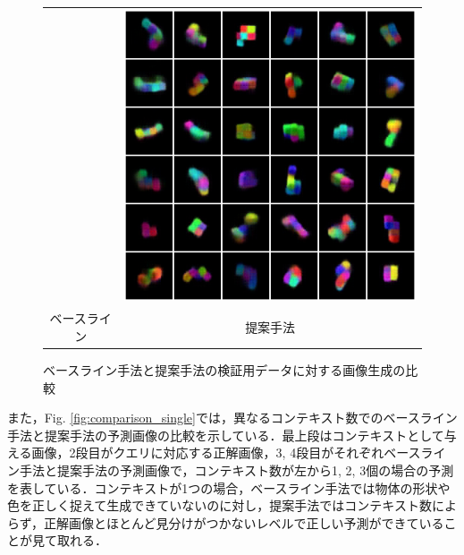 \begin{figure}[tbp]
\begin{center}
\begin{tabular}{cc}
\begin{minipage}{0.5\linewidth}
\begin{center}
        \end{center}
      \end{minipage}&
      \begin{minipage}{0.5\linewidth}
        \begin{center}
          \includegraphics[width=\linewidth]{./figures/comparison_proposal.png}
        \end{center}
      \end{minipage} \\
      ベースライン&提案手法
    \end{tabular}
    \caption{ベースライン手法と提案手法の検証用データに対する画像生成の比較}
    \label{fig:comparison}
  \end{center}
\end{figure}


また，Fig. \ref{fig:comparison_single}では，異なるコンテキスト数でのベースライン手法と提案手法の予測画像の比較を示している．最上段はコンテキストとして与える画像，2段目がクエリに対応する正解画像，3, 4段目がそれぞれベースライン手法と提案手法の予測画像で，コンテキスト数が左から1, 2, 3個の場合の予測を表している．コンテキストが1つの場合，ベースライン手法では物体の形状や色を正しく捉えて生成できていないのに対し，提案手法ではコンテキスト数によらず，正解画像とほとんど見分けがつかないレベルで正しい予測ができていることが見て取れる．

